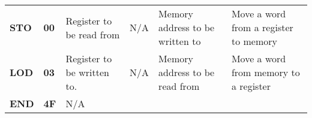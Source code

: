 \documentclass[]{article}
\begin{document}
\begin{longtable}[c]{@{}llllll@{}}
\begin{minipage}[t]{0.14\columnwidth}
\textbf{STO}
\strut\end{minipage} &
\begin{minipage}[t]{0.14\columnwidth}\raggedright\strut
\textbf{00}
\strut\end{minipage} &
\begin{minipage}[t]{0.14\columnwidth}\raggedright\strut
Register to be read from
\strut\end{minipage} &
\begin{minipage}[t]{0.14\columnwidth}\raggedright\strut
N/A
\strut\end{minipage} &
\begin{minipage}[t]{0.14\columnwidth}\raggedright\strut
Memory address to be written to
\strut\end{minipage} &
\begin{minipage}[t]{0.14\columnwidth}\raggedright\strut
Move a word from a register to memory
\strut\end{minipage}\tabularnewline
\begin{minipage}[t]{0.14\columnwidth}\raggedright\strut
\textbf{LOD}
\strut\end{minipage} &
\begin{minipage}[t]{0.14\columnwidth}\raggedright\strut
\textbf{03}
\strut\end{minipage} &
\begin{minipage}[t]{0.14\columnwidth}\raggedright\strut
Register to be written to.
\strut\end{minipage} &
\begin{minipage}[t]{0.14\columnwidth}\raggedright\strut
N/A
\strut\end{minipage} &
\begin{minipage}[t]{0.14\columnwidth}\raggedright\strut
Memory address to be read from
\strut\end{minipage} &
\begin{minipage}[t]{0.14\columnwidth}\raggedright\strut
Move a word from memory to a register
\strut\end{minipage}\tabularnewline
\begin{minipage}[t]{0.14\columnwidth}\raggedright\strut
\textbf{END}
\strut\end{minipage} &
\begin{minipage}[t]{0.14\columnwidth}\raggedright\strut
\textbf{4F}
\strut\end{minipage} &
\begin{minipage}[t]{0.14\columnwidth}\raggedright\strut
N/A
\strut\end{minipage} &
\begin{minipage}[t]{0.14\columnwidth}\raggedright\strut

\end{minipage}
\end{longtable}
\end{document}
